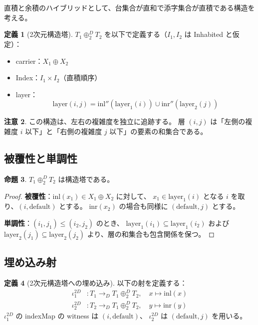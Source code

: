 \documentclass[a4paper,11pt]{ltjsarticle}
\theoremstyle{definition}
\newtheorem{definition}{定義}[section]
\newtheorem{proposition}[definition]{命題}
\newtheorem{remark}[definition]{注意}
\begin{document}
直積と余積のハイブリッドとして、台集合が直和で添字集合が直積である構造を考える。

\begin{definition}[2次元構造塔]
$T_1 \oplus_2^D T_2$ を以下で定義する（$I_1, I_2$ は Inhabited と仮定）：
\begin{itemize}
  \item carrier：$X_1 \oplus X_2$
  \item Index：$I_1 \times I_2$（直積順序）
  \item layer：
  \[
  \mathrm{layer}(i, j) = \mathrm{inl}''(\mathrm{layer}_1(i)) \cup \mathrm{inr}''(\mathrm{layer}_2(j))
  \]
\end{itemize}
\end{definition}

\begin{remark}
この構造は、左右の複雑度を独立に追跡する。
層 $(i, j)$ は「左側の複雑度 $i$ 以下」と「右側の複雑度 $j$ 以下」の要素の和集合である。
\end{remark}

\subsection{被覆性と単調性}

\begin{proposition}
$T_1 \oplus_2^D T_2$ は構造塔である。
\end{proposition}

\begin{proof}
\textbf{被覆性}：$\mathrm{inl}(x_1) \in X_1 \oplus X_2$ に対して、
$x_1 \in \mathrm{layer}_1(i)$ となる $i$ を取り、$(i, \mathrm{default})$ とする。
$\mathrm{inr}(x_2)$ の場合も同様に $(\mathrm{default}, j)$ とする。

\textbf{単調性}：$(i_1, j_1) \leq (i_2, j_2)$ のとき、
$\mathrm{layer}_1(i_1) \subseteq \mathrm{layer}_1(i_2)$ および $\mathrm{layer}_2(j_1) \subseteq \mathrm{layer}_2(j_2)$
より、層の和集合も包含関係を保つ。
\end{proof}

\subsection{埋め込み射}

\begin{definition}[2次元構造塔への埋め込み]
以下の射を定義する：
\begin{align*}
  \iota_1^{2D} &: T_1 \to_D T_1 \oplus_2^D T_2, \quad x \mapsto \mathrm{inl}(x) \\
  \iota_2^{2D} &: T_2 \to_D T_1 \oplus_2^D T_2, \quad y \mapsto \mathrm{inr}(y)
\end{align*}
$\iota_1^{2D}$ の indexMap の witness は $(i, \mathrm{default})$、
$\iota_2^{2D}$ は $(\mathrm{default}, j)$ を用いる。
\end{definition}
\end{document}
